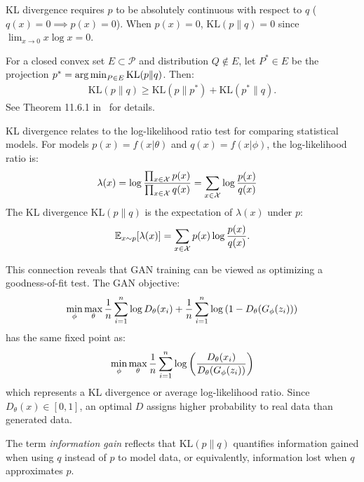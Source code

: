 \begin{remark}
	KL divergence requires $p$ to be absolutely continuous with respect to $q$ ($q(x) = 0 \implies p(x) = 0$). When $p(x) = 0$, $\text{KL}(p \| q) = 0$ since $\lim_{x \to 0} x\log{x} = 0$.
\end{remark}

\begin{theorem}
	For a closed convex set $E \subset \mathcal{P}$ and distribution $Q \not \in E$, let $P^* \in E$ be the projection $p^* = \operatorname*{arg\,min}_{P \in E} \text{KL}(p \| q)$. Then:
	\begin{align}
		\text{KL}(p \| q) \geq \text{KL}(p \| p^*) + \text{KL}(p^* \| q).
	\end{align}
	See Theorem 11.6.1 in~\cite{ref:cover-thomas} for details.
\end{theorem}

\begin{remark}
	KL divergence relates to the log-likelihood ratio test for comparing statistical models. For models $p(x) = f(x|\theta)$ and $q(x) = f(x|\phi)$, the log-likelihood ratio is:
	\begin{align}
		\lambda(x) & = \log{\prod_{x \in \mathcal{X}} p(x) \over \prod_{x \in \mathcal{X}} q(x)} = \sum_{x \in \mathcal{X}} \log {p(x) \over q(x)}
	\end{align}
	The KL divergence $\text{KL}(p \| q)$ is the expectation of $\lambda(x)$ under $p$:
	\begin{align}
		\mathbb{E}_{x \sim p}[\lambda(x)] = \sum_{x \in \mathcal{X}} p(x)\log {p(x) \over q(x)}.
	\end{align}
\end{remark}

This connection reveals that GAN training can be viewed as optimizing a goodness-of-fit test. The GAN objective:
\begin{align}
	\min_\phi\max_\theta{1 \over n} \sum_{i=1}^n \log{D_\theta(x_i)} + {1 \over n} \sum_{i=1}^n\log{(1 - D_\theta(G_\phi(z_i)))}
\end{align}
has the same fixed point as:
\begin{align}
	\min_\phi\max_\theta{1 \over n} \sum_{i=1}^n \log{\left({D_\theta(x_i) \over D_\theta(G_\phi(z_i))}\right)}
\end{align}
which represents a KL divergence or average log-likelihood ratio. Since $D_\theta(x) \in [0, 1]$, an optimal $D$ assigns higher probability to real data than generated data.

The term \textit{information gain} reflects that $\text{KL}(p \| q)$ quantifies information gained when using $q$ instead of $p$ to model data, or equivalently, information lost when $q$ approximates $p$.

